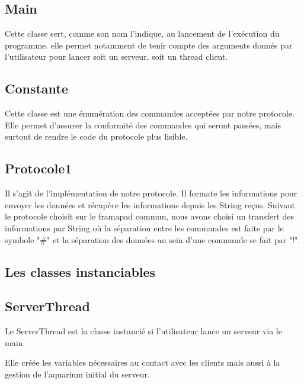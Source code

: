 \documentclass[a4paper, 12pt]{report}
\begin{document}
\begin{spacing}{1.3}
\textcolor{colortitre3}{\subsection*{Main}}
		
Cette classe sert, comme son nom l'indique, au lancement de l'exécution du programme. elle permet notamment de tenir compte des arguments donnés par l'utilisateur pour lancer soit un serveur, soit un thread client.
		
\textcolor{colortitre3}{\subsection*{Constante}}
Cette classe est une énumération des commandes acceptées par notre protocole. Elle permet d'assurer la conformité des commandes qui seront passées, mais surtout de rendre le code du protocole plus lisible.

\textcolor{colortitre3}{\subsection*{Protocole1}}
		
Il s'agit de l'implémentation de notre protocole. Il formate les informations pour envoyer les données et récupère les informations depuis les String reçus. Suivant le protocole choisit sur le framapad commun, nous avons choisi un transfert des informations par String où la séparation entre les commandes est faite par le symbole "\#" et la séparation des données au sein d'une commande se fait par "!".

\newpage

\textcolor{colortitre2}{\section*{Les classes instanciables}} 

\textcolor{colortitre3}{\subsection*{ServerThread}}

Le ServerThread est la classe instancié si l'utilisateur lance un serveur via le main.

Elle créée les variables nécessaires au contact avec les clients mais aussi à la gestion de l'aquarium initial du serveur.


\end{spacing}
\end{document}
